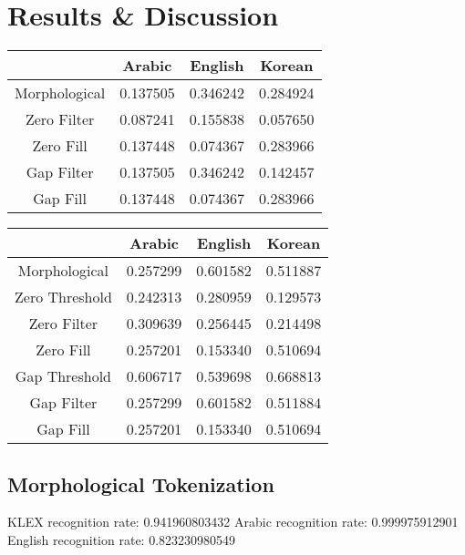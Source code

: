 \chapter{Results \& Discussion}

\begin{center}
	\begin{tabular}{ | c | c | c | c |}
		\cline{2-4}
		\multicolumn{1}{c|}{} & Arabic & English & Korean \\ \hline
		Morphological & 0.137505 & 0.346242 & 0.284924 \\ \hline
		Zero Filter & 0.087241 & 0.155838 & 0.057650 \\ \hline
		Zero Fill & 0.137448 & 0.074367 & 0.283966 \\ \hline
		Gap Filter & 0.137505 & 0.346242 & 0.142457 \\ \hline
		Gap Fill & 0.137448 & 0.074367 & 0.283966 \\ \hline
	\end{tabular}
\end{center}

\begin{center}
	\begin{tabular}{ | c | c | c | c |}
		\cline{2-4}
		\multicolumn{1}{c|}{} & Arabic & English & Korean \\ \hline
		Morphological & 0.257299 & 0.601582 & 0.511887 \\ \hline \hline
		Zero Threshold & 0.242313 & 0.280959 & 0.129573 \\ \hline
		Zero Filter & 0.309639 & 0.256445 & 0.214498 \\ \hline
		Zero Fill & 0.257201 & 0.153340 & 0.510694 \\ \hline \hline
		Gap Threshold & 0.606717 & 0.539698 & 0.668813 \\ \hline
		Gap Filter & 0.257299 & 0.601582 & 0.511884 \\ \hline
		Gap Fill & 0.257201 & 0.153340 & 0.510694 \\ \hline
	\end{tabular}
\end{center}


\section{Morphological Tokenization}

KLEX recognition rate: 0.941960803432
Arabic recognition rate: 0.999975912901
English recognition rate: 0.823230980549

